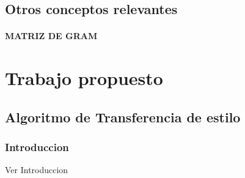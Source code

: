 \documentclass[a4paper,12pt,spanish]{book}
\begin{document}
     \section {Otros conceptos relevantes}
	\subsubsection{MATRIZ DE GRAM}
     
     
\chapter{Trabajo propuesto}
  \section{Algoritmo de Transferencia de estilo}
    \subsection{Introduccion}
    Ver Introduccion 
\end{document}
